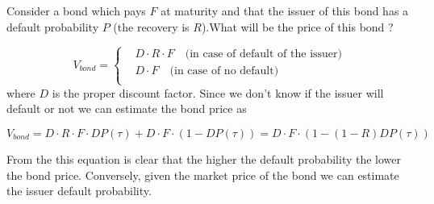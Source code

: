 Consider a bond which pays $F$ at maturity and that the issuer of this bond has a default probability $P$ (the recovery is $R$).What will be the price of this bond ?

\begin{equation}
V_{bond} =
\begin{cases}
& D \cdot R \cdot F\quad\textrm{(in case of default of the issuer)}\\
&D \cdot F\quad\textrm{(in case of no default)}\\
\end{cases}\end{equation} 
where \(D\) is the proper discount factor. Since we don't
know if the issuer will default or not we can estimate the bond price as

\begin{equation}
V_{bond} = D \cdot R \cdot F \cdot DP ( \tau ) + D \cdot F \cdot ( 1 − DP ( \tau)) = D\cdot F \cdot ( 1 − ( 1 − R ) DP ( \tau ))
\end{equation}

From the this equation is clear that the higher the default probability the lower the bond price. Conversely, given the market price of the bond we can estimate the issuer default probability.

%


